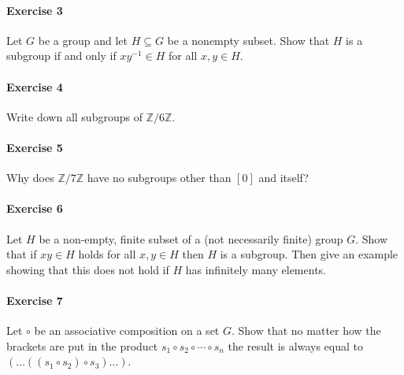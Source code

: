 \paragraph{Exercise 3} Let $G$ be a group and let $H\subseteq G$ be a nonempty subset. Show that $H$ is a subgroup if and only if $xy^{-1}\in H$ for all $x,y\in H$.

\paragraph{Exercise 4} Write down all subgroups of $\mathbb{Z}/6\mathbb{Z}$.

\paragraph{Exercise 5} Why does $\mathbb{Z}/7\mathbb{Z}$ have no subgroups other than $[0]$ and itself?

\paragraph{Exercise 6} Let $H$ be a non-empty, finite subset of a (not necessarily finite) group $G$. Show that if $xy\in H$ holds for all $x,y\in H$ then $H$ is a subgroup. Then give an example showing that this does not hold if $H$ has infinitely many elements.

\paragraph{Exercise 7} Let $\circ$ be an associative composition on a set $G$. Show that no matter how the brackets are put in the product $s_{1}\circ s_{2}\circ\cdots\circ s_{n}$ the result is always equal to $(\ldots((s_{1}\circ s_{2})\circ s_{3})\ldots)$.
